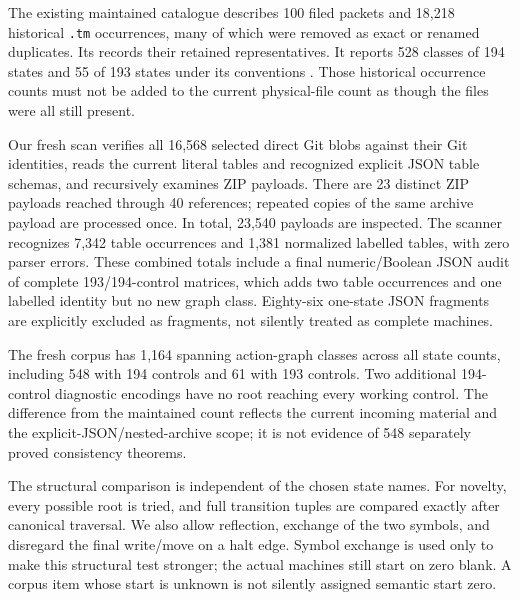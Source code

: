 \documentclass[11pt,a4paper]{article}
\begin{document}
The existing maintained catalogue describes 100 filed packets and 18,218
historical \texttt{.tm} occurrences, many of which were removed as exact or
renamed duplicates. Its  records their retained
representatives. It reports 528 classes of 194 states and 55 of 193 states
under its conventions \cite{catalog}. Those historical occurrence counts
must not be added to the current physical-file count as though the files
were all still present.

Our fresh scan verifies all 16,568 selected direct Git blobs against their
Git identities, reads the current literal tables and recognized explicit
JSON table schemas, and recursively examines ZIP payloads. There are 23
distinct ZIP payloads reached through 40 references; repeated copies of the
same archive payload are processed once. In total, 23,540 payloads are
inspected. The scanner recognizes 7,342 table occurrences and 1,381
normalized labelled tables, with zero parser errors. These combined totals
include a final numeric/Boolean JSON audit of complete 193/194-control
matrices, which adds two table occurrences and one labelled identity but
no new graph class. Eighty-six one-state
JSON fragments are explicitly excluded as fragments, not silently treated
as complete machines.

The fresh corpus has 1,164 spanning action-graph classes across all state
counts, including 548 with 194 controls and 61 with 193 controls. Two
additional 194-control diagnostic encodings have no root reaching every
working control. The difference from the maintained count reflects the
current incoming material and the explicit-JSON/nested-archive scope; it is
not evidence of 548 separately proved consistency theorems.

The structural comparison is independent of the chosen state names. For
novelty, every possible root is tried, and full transition tuples are
compared exactly after canonical traversal. We also allow reflection,
exchange of the two symbols, and disregard the final write/move on a halt
edge. Symbol exchange is used only to make this structural test stronger;
the actual machines still start on zero blank. A corpus item whose start
is unknown is not silently assigned semantic start zero.
\end{document}
